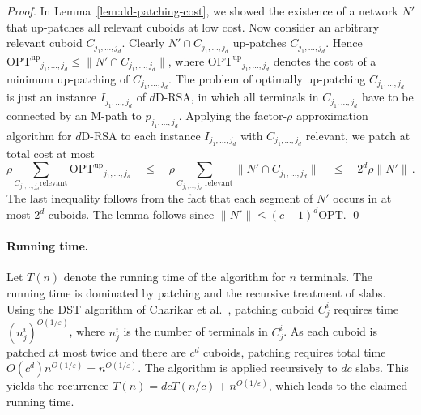 \documentclass[11pt]{llncs}
\newcommand{\eps}{\ensuremath{\varepsilon}\xspace}
\newcommand{\opt}{\ensuremath{\mathrm{OPT}}\xspace}
\newcommand{\optup}{\ensuremath{\opt^\mathrm{up}}\xspace}
\newcommand{\etal}{et al.}
\newenvironment{pf}{\begin{proof}}{\qed\end{proof}}
\begin{document}
\begin{pf}
  In Lemma~\ref{lem:dd-patching-cost}, we showed the existence of a
  network $N'$ that up-patches all relevant cuboids at low cost.  Now
  consider an arbitrary relevant cuboid $C_{j_1,\dots,j_d}$.  Clearly
  $N'\cap C_{j_1,\dots,j_d}$ up-patches $C_{j_1,\dots,j_d}$.  Hence
  $\optup_{j_1,\dots,j_d} \le \|N'\cap C_{j_1,\dots,j_d}\|$, where
  $\optup_{j_1,\dots,j_d}$ denotes the cost of a minimum up-patching
  of $C_{j_1,\dots,j_d}$.  The problem of optimally up-patching
  $C_{j_1,\dots,j_d}$ is just an instance $I_{j_1,\dots,j_d}$ of
  $d$D-RSA, in which all terminals in $C_{j_1,\dots,j_d}$ have to be
  connected by an M-path to $p_{j_1,\dots,j_d}$.  Applying the
  factor-$\rho$ approximation algorithm for $d$D-RSA to each instance
  $I_{j_1,\dots,j_d}$ with $C_{j_1,\dots,j_d}$ relevant, we patch at
  total cost at most
  \begin{displaymath}
    \rho\sum_{C_{j_1,\dots,j_d}\text{
	relevant}}\optup_{j_1,\dots,j_d} \quad\le\quad
    \rho\sum_{C_{j_1,\dots,j_d}\text{ relevant}}\|N'\cap
    C_{j_1,\dots,j_d}\| \quad\le\quad 2^d\rho \|N'\|\,. 
  \end{displaymath}
  The last inequality follows from the fact that each segment of $N'$
  occurs in at most $2^d$ cuboids.  The lemma follows since
  $\|N'\|\leq (c+1)^d\opt$.
\end{pf}

\paragraph{Running time.}

Let $T(n)$ denote the running time of the algorithm for $n$
terminals. The running time is dominated by patching and the recursive
treatment of slabs. Using the DST algorithm of Charikar
\etal~\cite{cccdggl-aadsp-98}, patching cuboid $C_j^i$ requires time 
$(n_j^i)^{O(1/\eps)}$, where $n_j^i$ is the number of terminals in
$C_j^i$. As each cuboid is patched at most twice and there are $c^d$
cuboids, patching requires total time $O(c^d) n^{O(1/\eps)} =
n^{O(1/\eps)}$. The algorithm is applied recursively to $dc$
slabs. This yields the recurrence $T(n) = dc T(n/c) + n^{O(1/\eps)}$,
which leads to the claimed running time.
\end{document}
